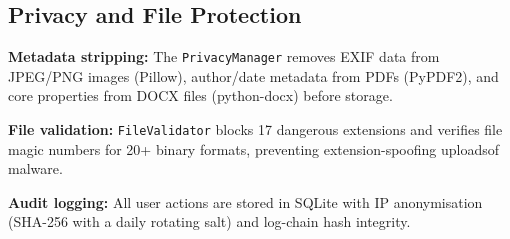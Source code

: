 \subsection{Privacy and File Protection}

\textbf{Metadata stripping:} The \texttt{PrivacyManager} removes
EXIF data from JPEG/PNG images (Pillow), author/date metadata from
PDFs (PyPDF2), and core properties from DOCX files (python-docx)
before storage.

\textbf{File validation:} \texttt{FileValidator} blocks 17 dangerous
extensions and verifies file magic numbers for 20+ binary formats,
preventing extension-spoofing uploadsof malware.

\textbf{Audit logging:} All user actions are stored in SQLite with IP
anonymisation (SHA-256 with a daily rotating salt) and log-chain
hash integrity.
